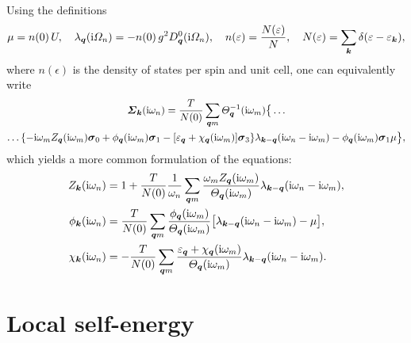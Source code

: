 Using the definitions \cite{MargineGiustino13}
%
\begin{align*}
    \mu = n(0) \, U,
        \quad
    \lambda_{\boldsymbol q}(\mathrm i \varOmega_n) = -n(0) \, g^2 D_{\boldsymbol q}^0(\mathrm i \varOmega_n),
        \quad
    n(\varepsilon) = \frac{N(\varepsilon)} N,
        \quad
    N(\varepsilon) = \sum_{\boldsymbol k} \delta(\varepsilon - \varepsilon_{\boldsymbol k}),
\end{align*}
%
where $n(\epsilon)$ is the density of states per spin and unit cell, one can
equivalently write
%
\begin{multline*}
    \boldsymbol {\varSigma}_{\boldsymbol k} (\mathrm i \omega_n)
    = \frac T {N(0)} \sum_{\boldsymbol q m}
    \varTheta_{\boldsymbol q}^{-1}(\mathrm i \omega_m) \big \{ \dots
        \\
        \dots \{
            - \mathrm i \omega_m Z_{\boldsymbol q}(\mathrm i \omega_m) \boldsymbol \sigma_0
            + \phi_{\boldsymbol q}(\mathrm i \omega_m) \boldsymbol \sigma_1
            - [\varepsilon_{\boldsymbol q} + \chi_{\boldsymbol q}(\mathrm i \omega_m)] \boldsymbol \sigma_3
            \}
        \lambda_{\boldsymbol k - \boldsymbol q}(\mathrm i \omega_n - \mathrm i \omega_m)
        - \phi_{\boldsymbol q}(\mathrm i \omega_m) \boldsymbol \sigma_1 \mu
    \big \},
\end{multline*}
%
which yields a more common formulation of the  equations:
%
\begin{subequations}
    \begin{align}
        Z_{\boldsymbol k}(\mathrm i \omega_n) &= 1 + \frac T {N(0)} \frac 1 {\omega_n}
        \sum_{\boldsymbol q m} \frac
            {\omega_m Z_{\boldsymbol q}(\mathrm i \omega_m)}
            {\varTheta_{\boldsymbol q}(\mathrm i \omega_m)}
        \lambda_{\boldsymbol k - \boldsymbol q}(\mathrm i \omega_n - \mathrm i \omega_m),
        \\
        \phi_{\boldsymbol k}(\mathrm i \omega_n) &= \frac T {N(0)}
        \sum_{\boldsymbol q m} \frac
            {\phi_{\boldsymbol q}(\mathrm i \omega_m)}
            {\varTheta_{\boldsymbol q}(\mathrm i \omega_m)}
        \big[ \lambda_{\boldsymbol k - \boldsymbol q}(\mathrm i \omega_n - \mathrm i \omega_m) - \mu \big],
        \\
        \chi_{\boldsymbol k}(\mathrm i \omega_n) &= -\frac T {N(0)}
        \sum_{\boldsymbol q m} \frac
            {\varepsilon_{\boldsymbol q} + \chi_{\boldsymbol q}(\mathrm i \omega_m)}
            {\varTheta_{\boldsymbol q}(\mathrm i \omega_m)}
        \lambda_{\boldsymbol k - \boldsymbol q}(\mathrm i \omega_n - \mathrm i \omega_m).
    \end{align}
\end{subequations}

\section{Local self-energy}

